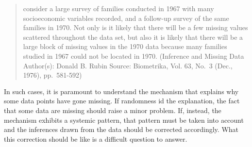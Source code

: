 \documentclass[
  10pt,
  dvipsnames,enabledeprecatedfontcommands]{scrartcl}
\begin{document}
\begin{quote}
consider a large survey of families conducted in 1967 with many
socioeconomic variables recorded, and a follow-up survey of the same
families in 1970. Not only is it likely that there will be a few missing
values scattered throughout the data set, but also it is likely that
there will be a large block of missing values in the 1970 data because
many families studied in 1967 could not be located in 1970. (Inference
and Missing Data Author(s): Donald B. Rubin Source: Biometrika, Vol. 63,
No.~3 (Dec., 1976), pp.~581-592)
\end{quote}

In such cases, it is paramount to understand the mechanism that explains
why some data points have gone missing. If randomness id the
explanation, the fact that some data are missing should raise a minor
problem. If, instead, the mechanism exhibits a systemic pattern, that
pattern must be taken into account and the inferences drawn from the
data should be corrected accordingly. What this correction should be
like is a difficult question to answer.
\end{document}
